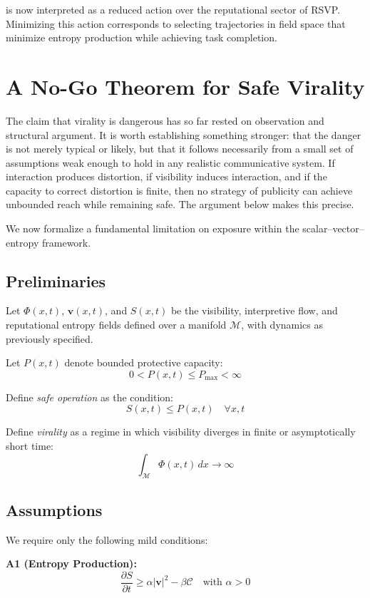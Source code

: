 \documentclass[12pt,a4paper]{article}
\begin{document}
is now interpreted as a reduced action over the reputational sector of RSVP. Minimizing this action corresponds to selecting trajectories in field space that minimize entropy production while achieving task completion.

\section{A No-Go Theorem for Safe Virality}

The claim that virality is dangerous has so far rested on observation and structural argument. It is worth establishing something stronger: that the danger is not merely typical or likely, but that it follows necessarily from a small set of assumptions weak enough to hold in any realistic communicative system. If interaction produces distortion, if visibility induces interaction, and if the capacity to correct distortion is finite, then no strategy of publicity can achieve unbounded reach while remaining safe. The argument below makes this precise.

We now formalize a fundamental limitation on exposure within the scalar--vector--entropy framework.

\subsection{Preliminaries}

Let $\Phi(x,t)$, $\mathbf{v}(x,t)$, and $S(x,t)$ be the visibility, interpretive flow, and reputational entropy fields defined over a manifold $\mathcal{M}$, with dynamics as previously specified.

Let $P(x,t)$ denote bounded protective capacity:
\[
0 < P(x,t) \leq P_{\max} < \infty
\]

Define \emph{safe operation} as the condition:
\[
S(x,t) \leq P(x,t) \quad \forall x,t
\]

Define \emph{virality} as a regime in which visibility diverges in finite or asymptotically short time:
\[
\int_{\mathcal{M}} \Phi(x,t)\,dx \rightarrow \infty
\]

\subsection{Assumptions}

We require only the following mild conditions:

\medskip
\noindent\textbf{A1 (Entropy Production):}
\[
\frac{\partial S}{\partial t} \geq \alpha |\mathbf{v}|^2 - \beta \mathcal{C}
\quad \text{with } \alpha > 0
\]
\end{document}

